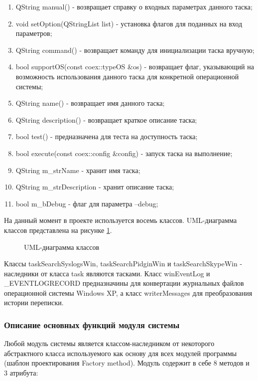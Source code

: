 \begin{enumerate}
\item QString manual() - возвращает справку о входных параметрах данного таска;
\item void setOption(QStringList list) - установка флагов для поданных на вход параметров;
\item QString command() - возвращает команду для инициализации таска вручную;
\item bool supportOS(const coex::typeOS \&os) - возвращает флаг, указывающий на возможность использования данного таска для конкретной операционной системы;
\item QString name() - возвращает имя данного таска;
\item QString description() - возвращает краткое описание таска;
\item bool test() - предназначена для теста на доступность таска;
\item bool execute(const coex::config \&config) - запуск таска на выполнение;
\item QString m\_strName - хранит имя таска;
\item QString m\_strDescription - хранит описание таска;
\item bool m\_bDebug - флаг для параметра --debug;
\end{enumerate}

На данный момент в проекте используется восемь классов. UML-диаграмма классов представлена на рисунке \ref{UML:UML}.

\begin{figure}[h!]
\caption{UML-диаграмма классов}
\label{UML:UML}
\end{figure}

Классы taskSearchSyslogsWin, taskSearchPidginWin и taskSearchSkypeWin - наследники от класса task являются тасками. Класс winEventLog и \_EVENTLOGRECORD предназначины для конвертации журнальных файлов операционной системы Windows XP, а класс writerMessages для преобразования истории переписки.

\subsubsection{Описание основных функций модуля системы}

Любой модуль системы является классом-наследником от некоторого абстрактного класса используемого как основу для всех модулей программы (шаблон проектирования Factory method). Модуль содержит в себе 8 методов и 3 атрибута:

